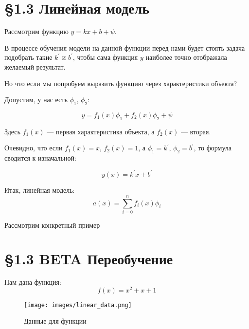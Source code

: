 
\centering
\section*{\S 1.3 Линейная модель}
\vspace{0.8cm}
\raggedright

Рассмотрим функцию \( y = kx + b + \psi \).

В процессе обучения модели на данной функции перед нами
будет стоять задача подобрать такие \( k^{\prime} \) и \( b^{\prime} \),
чтобы сама функция \( y \) наиболее точно отображала желаемый результат.

\vspace{0.5cm}

Но что если мы попробуем выразить функцию через характеристики объекта?

Допустим, у нас есть \( \phi_1 \), \( \phi_2 \):

\[
    y = f_1(x)\phi_1 + f_2(x)\phi_2 + \psi
\]

Здесь \( f_1(x) \) — первая характеристика объекта, а \( f_2(x) \) — вторая.

Очевидно, что если \( f_1(x) = x \), \( f_2(x) = 1 \), а \( \phi_1 = k^{\prime} \), \( \phi_2 = b^{\prime} \),
то формула сводится к изначальной:

\[
    y(x) = k^{\prime}x + b^{\prime}
\]

Итак, линейная модель:
\[
    a(x) = \sum_{i=0}^{n} f_i(x)\phi_i
\]

Рассмотрим конкретный пример

\centering
\section*{\S 1.3 BETA Переобучение}
\vspace{0.8cm}
\raggedright

Нам дана функция:
\[
    f(x) = x^2 + x + 1
\]
\begin{figure}[htbp]
    \centering
    \texttt{[image: images/linear\_data.png]}
    \caption{Данные для функции}
    \label{fig:example_linFunc}
\end{figure}


